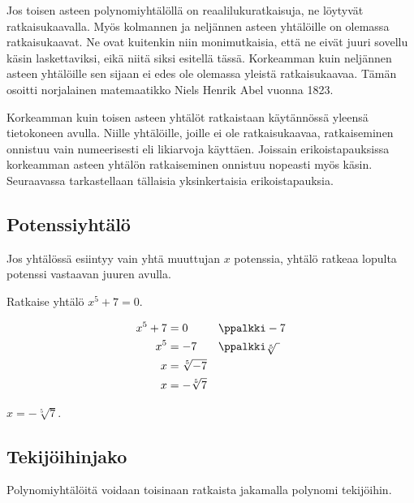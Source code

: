 
Jos toisen asteen polynomiyhtälöllä on reaalilukuratkaisuja, ne löytyvät ratkaisukaavalla. Myös kolmannen ja neljännen asteen yhtälöille on olemassa ratkaisukaavat. Ne ovat kuitenkin niin monimutkaisia, että ne eivät juuri sovellu käsin laskettaviksi, eikä niitä siksi esitellä tässä. Korkeamman kuin neljännen asteen yhtälöille sen sijaan ei edes ole olemassa yleistä ratkaisukaavaa. Tämän osoitti norjalainen matemaatikko Niels Henrik Abel vuonna 1823.

Korkeamman kuin toisen asteen yhtälöt ratkaistaan käytännössä yleensä tietokoneen avulla. Niille yhtälöille, joille ei ole ratkaisukaavaa, ratkaiseminen onnistuu vain numeerisesti eli likiarvoja käyttäen. Joissain erikoistapauksissa korkeamman asteen yhtälön ratkaiseminen onnistuu nopeasti myös käsin. Seuraavassa tarkastellaan tällaisia yksinkertaisia erikoistapauksia.

\subsection{Potenssiyhtälö}

Jos yhtälössä esiintyy vain yhtä muuttujan $x$ potenssia, yhtälö ratkeaa lopulta potenssi vastaavan juuren avulla.

\begin{esimerkki}
Ratkaise yhtälö $x^5+7=0$.

	\begin{esimratk}
\begin{align*}
x^5+7 &= 0 && \ppalkki -7 \\
x^5 &= -7 && \ppalkki \sqrt[5]{ \ } \\
x &= \sqrt[5]{-7} \\
x &= -\sqrt[5]{7}
\end{align*} 
	\end{esimratk}

	\begin{esimvast} $x = -\sqrt[5]{7}$.
	\end{esimvast}
\end{esimerkki}

\subsection{Tekijöihinjako}

Polynomiyhtälöitä voidaan toisinaan ratkaista jakamalla polynomi tekijöihin.

